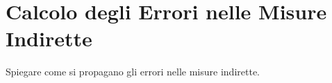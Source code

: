 \section{Calcolo degli Errori nelle Misure Indirette}
Spiegare come si propagano gli errori nelle misure indirette.

